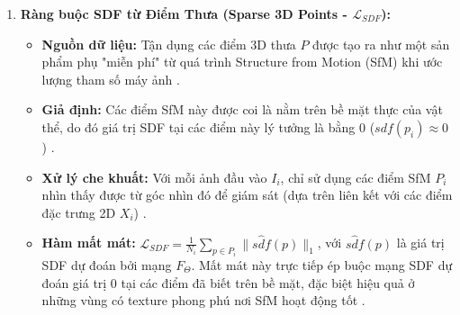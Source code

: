 \begin{enumerate}
    \item \textbf{Ràng buộc SDF từ Điểm Thưa (Sparse 3D Points - $\mathcal{L}_{SDF}$):}
        \begin{itemize}
            \item \textbf{Nguồn dữ liệu:} Tận dụng các điểm 3D thưa $P$ được tạo ra như một sản phẩm phụ "miễn phí" từ quá trình Structure from Motion (SfM) \cite{Schonberger16SFMRevisited, Snavely2006PhotoTourism} khi ước lượng tham số máy ảnh \cite{Fu2022GeoNeus_source_30, Fu2022GeoNeus_source_94, Fu2022GeoNeus_source_95, Fu2022GeoNeus_source_96}.
            \item \textbf{Giả định:} Các điểm SfM này được coi là nằm trên bề mặt thực của vật thể, do đó giá trị SDF tại các điểm này lý tưởng là bằng 0 ($sdf(p_i) \approx 0$) \cite{Fu2022GeoNeus_source_97, Fu2022GeoNeus_source_98}.
            \item \textbf{Xử lý che khuất:} Với mỗi ảnh đầu vào $I_i$, chỉ sử dụng các điểm SfM $P_i$ nhìn thấy được từ góc nhìn đó để giám sát (dựa trên liên kết với các điểm đặc trưng 2D $X_i$) \cite{Fu2022GeoNeus_source_100, Fu2022GeoNeus_source_101, Fu2022GeoNeus_source_103}.
            \item \textbf{Hàm mất mát:} $\mathcal{L}_{SDF} = \frac{1}{N_i} \sum_{p \in P_i} \| s\hat{d}f(p) \|_1$, với $s\hat{d}f(p)$ là giá trị SDF dự đoán bởi mạng $F_\Theta$. Mất mát này trực tiếp ép buộc mạng SDF dự đoán giá trị 0 tại các điểm đã biết trên bề mặt, đặc biệt hiệu quả ở những vùng có texture phong phú nơi SfM hoạt động tốt \cite{Fu2022GeoNeus_source_104, Fu2022GeoNeus_source_105, Fu2022GeoNeus_source_169}.
        \end{itemize}


\end{enumerate}
